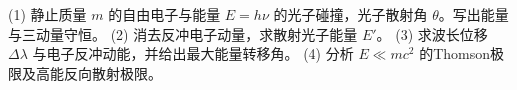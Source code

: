 (1) 静止质量 \(m\) 的自由电子与能量 \(E=h\nu\) 的光子碰撞，光子散射角 \(\theta\)。写出能量与三动量守恒。
(2) 消去反冲电子动量，求散射光子能量 \(E'\)。
(3) 求波长位移 \(\Delta\lambda\) 与电子反冲动能，并给出最大能量转移角。
(4) 分析 \(E\ll mc^2\) 的Thomson极限及高能反向散射极限。
